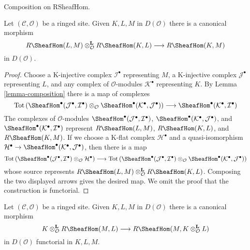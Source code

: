 \begin{lemma}
\label{lemma-internal-hom-composition}
\begin{slogan}
Composition on RSheafHom.
\end{slogan}
Let $(\mathcal{C}, \mathcal{O})$ be a ringed site. Given $K, L, M$ in
$D(\mathcal{O})$ there is a canonical morphism
$$
R\SheafHom(L, M) \otimes_\mathcal{O}^\mathbf{L} R\SheafHom(K, L)
\longrightarrow R\SheafHom(K, M)
$$
in $D(\mathcal{O})$.
\end{lemma}

\begin{proof}
Choose a K-injective complex $\mathcal{I}^\bullet$ representing $M$,
a K-injective complex $\mathcal{J}^\bullet$ representing $L$, and
any complex of $\mathcal{O}$-modules $\mathcal{K}^\bullet$ representing $K$.
By Lemma \ref{lemma-composition} there is a map of complexes
$$
\text{Tot}\left(
\SheafHom^\bullet(\mathcal{J}^\bullet, \mathcal{I}^\bullet)
\otimes_\mathcal{O}
\SheafHom^\bullet(\mathcal{K}^\bullet, \mathcal{J}^\bullet)
\right)
\longrightarrow
\SheafHom^\bullet(\mathcal{K}^\bullet, \mathcal{I}^\bullet)
$$
The complexes of $\mathcal{O}$-modules
$\SheafHom^\bullet(\mathcal{J}^\bullet, \mathcal{I}^\bullet)$,
$\SheafHom^\bullet(\mathcal{K}^\bullet, \mathcal{J}^\bullet)$, and
$\SheafHom^\bullet(\mathcal{K}^\bullet, \mathcal{I}^\bullet)$
represent $R\SheafHom(L, M)$, $R\SheafHom(K, L)$, and $R\SheafHom(K, M)$.
If we choose a K-flat complex $\mathcal{H}^\bullet$ and a quasi-isomorphism
$\mathcal{H}^\bullet \to
\SheafHom^\bullet(\mathcal{K}^\bullet, \mathcal{J}^\bullet)$,
then there is a map
$$
\text{Tot}\left(
\SheafHom^\bullet(\mathcal{J}^\bullet, \mathcal{I}^\bullet)
\otimes_\mathcal{O} \mathcal{H}^\bullet
\right)
\longrightarrow
\text{Tot}\left(
\SheafHom^\bullet(\mathcal{J}^\bullet, \mathcal{I}^\bullet)
\otimes_\mathcal{O}
\SheafHom^\bullet(\mathcal{K}^\bullet, \mathcal{J}^\bullet)
\right)
$$
whose source represents
$R\SheafHom(L, M) \otimes_\mathcal{O}^\mathbf{L} R\SheafHom(K, L)$.
Composing the two displayed arrows gives the desired map. We omit the
proof that the construction is functorial.
\end{proof}

\begin{lemma}
\label{lemma-internal-hom-diagonal-better}
Let $(\mathcal{C}, \mathcal{O})$ be a ringed site. Given $K, L, M$
in $D(\mathcal{O})$ there is a canonical morphism
$$
K \otimes_\mathcal{O}^\mathbf{L} R\SheafHom(M, L)
\longrightarrow
R\SheafHom(M, K \otimes_\mathcal{O}^\mathbf{L} L)
$$
in $D(\mathcal{O})$ functorial in $K, L, M$.
\end{lemma}

